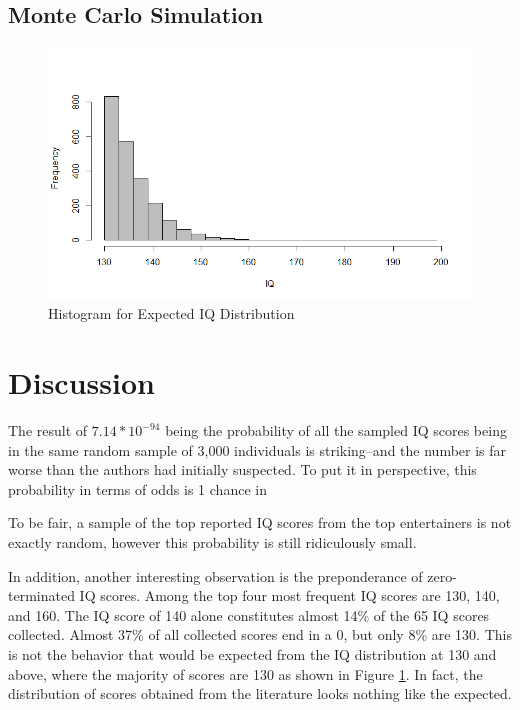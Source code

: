 \documentclass[12pt,letterpaper,titlepage,oneside]{article}
\begin{document}
\subsection{Monte Carlo Simulation}
\begin{figure}[h!]
\caption{Histogram for Expected IQ Distribution}
\label{iqhist}
\includegraphics[scale=.5]{expected-above-average}
\end{figure}

\section{Discussion}
The result of $7.14 * 10^{-94}$ being the probability of all the sampled IQ scores being in the same random sample of 3,000 individuals is striking--and the number is far worse than the authors had initially suspected. To put it in perspective, this probability in terms of odds is 1 chance in
\begin{quote}

\end{quote} 
To be fair, a sample of the top reported IQ scores from the top entertainers is not exactly random, however this probability is still ridiculously small.

In addition, another interesting observation is the preponderance of zero-terminated IQ scores. Among the top four most frequent IQ scores are 130, 140, and 160. The IQ score of 140 alone constitutes almost 14\% of the 65 IQ scores collected. Almost 37\% of all collected scores end in a 0, but only 8\% are 130. This is not the behavior that would be expected from the IQ distribution at 130 and above, where the majority of scores are 130 as shown in Figure \ref{iqhist}. In fact, the distribution of scores obtained from the literature looks nothing like the expected.
\end{document}
